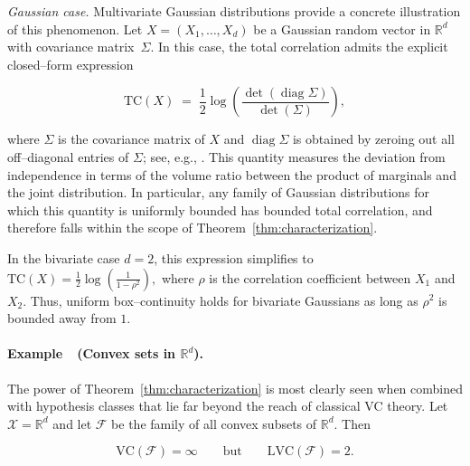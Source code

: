 \documentclass[arxiv]{colt2026}
\newcounter{examplectr}
\newcommand{\X}{\mathcal{X}}
\newcommand{\F}{\mathcal{F}}
\newcommand{\VC}{\mathrm{VC}}
\newcommand{\LVC}{\mathrm{LVC}}
\newcommand{\ron}[1]{\textcolor{red}{[Ron: #1]}}
\begin{document}
\smallskip
\noindent
\emph{Gaussian case.}
Multivariate Gaussian distributions provide a concrete illustration of this phenomenon.
Let $X=(X_1,\ldots,X_d)$ be a Gaussian random vector in $\mathbb R^d$ with
covariance matrix~$\Sigma$.
In this case, the total correlation admits the explicit closed--form expression

\vspace{-0.5em}
\[
\mathrm{TC}(X)
\;=\;
\frac12 \log\!\left(\frac{\det(\operatorname{diag}\Sigma)}{\det(\Sigma)}\right),
\]

where $\Sigma$ is the covariance matrix of $X$ and $\operatorname{diag}\Sigma$
is obtained by zeroing out all off--diagonal entries of $\Sigma$; see, e.g.,
\citet[Section~8.3]{cover2012}. This quantity measures the deviation from independence in terms of the volume ratio between the product of marginals and the joint distribution.
In particular, any family of Gaussian distributions for which this quantity is
uniformly bounded has bounded total correlation, and therefore falls within the
scope of Theorem~\ref{thm:characterization}.


In the bivariate case $d=2$, this expression simplifies to
$\mathrm{TC}(X)
=
\tfrac12 \log\!\left(\frac{1}{1-\rho^2}\right),$
where $\rho$ is the correlation coefficient between $X_1$ and $X_2$.
Thus, uniform box--continuity holds for bivariate Gaussians as long as
$\rho^2$ is bounded away from $1$. 


\vspace{-0.4em}
\paragraph{Example~\theexamplectr\ (Convex sets in $\mathbb R^d$).}\label{ex:convex}
The power of Theorem~\ref{thm:characterization} is most clearly seen when combined with hypothesis classes that lie far beyond the reach of classical VC theory. Let $\X=\mathbb R^d$ and let $\F$ be the family of all convex subsets of $\mathbb R^d$. Then

\vspace{-0.5em}
\[
\VC(\F)=\infty
\qquad\text{but}\qquad
\LVC(\F)=2.
\]
\end{document}
